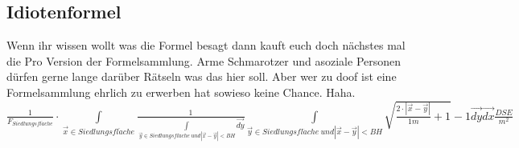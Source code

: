 \subsection{Idiotenformel}
Wenn ihr wissen wollt was die Formel besagt dann kauft euch doch nächstes mal
die Pro Version der Formelsammlung. Arme Schmarotzer und asoziale Personen
dürfen gerne lange darüber Rätseln was das hier soll. Aber wer zu doof ist eine
Formelsammlung ehrlich zu erwerben hat sowieso keine Chance. Haha.\\
$\frac{1}{F_{Siedlungsfl\ddot ache}}\cdot\int\limits_{\vec{x} \in
Siedlungsfl\ddot ache} \frac{1}{\int\limits_{\vec{y}\in Siedlungsfl\ddot ache\ und \left|\vec{x}-\vec{y} \right|<BH}\vec{dy}} \int\limits_{\vec{y}\in Siedlungsfl\ddot ache\ und \left|\vec{x}-\vec{y} \right|<BH} \sqrt{\frac{2\cdot\left|\vec{x}-\vec{y}\right|}{1m}+1}-1\vec{dy}\vec{dx}\frac{DSE}{m^2}$
